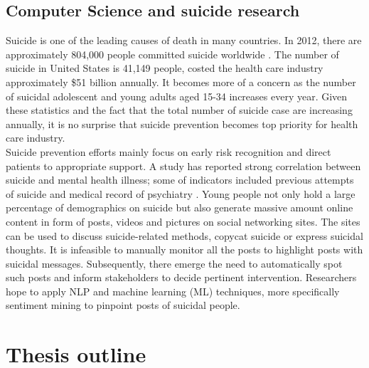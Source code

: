 \subsection*{Computer Science and suicide research}
Suicide is one of the leading causes of death in many countries. In 2012, there are approximately 804,000 people committed suicide worldwide \cite{WorldHealthOrganization2014}. The number of suicide in United States is 41,149 people, costed the health care industry approximately \$51 billion annually\cite{CentersforDiseaseControlandPreventionCDC2013}. It becomes more of a concern as the number of suicidal adolescent and young adults aged 15-34 increases every year. Given these statistics and the fact that the total number of suicide case are increasing annually, it is no surprise that suicide prevention becomes top priority for health care industry.\\
Suicide prevention efforts mainly focus on early risk recognition and direct patients to appropriate support. A study has reported strong correlation between suicide and mental health illness; some of indicators included previous attempts of suicide and medical record of psychiatry \cite{Harris1997}. Young people not only hold a large percentage of demographics on suicide but also generate massive amount online content in form of posts, videos and pictures on social networking sites. The sites can be used to discuss suicide-related methods, copycat suicide or express suicidal thoughts. It is infeasible to manually monitor all the posts to highlight posts with suicidal messages. Subsequently, there emerge the need to automatically spot such posts and inform stakeholders to decide pertinent intervention. Researchers hope to apply NLP and machine learning (ML) techniques, more specifically sentiment mining to pinpoint posts of suicidal people. 

\section{Thesis outline}





